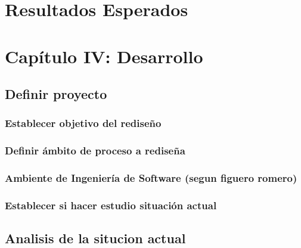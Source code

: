 \documentclass[
]{article}
\begin{document}
\hypertarget{resultados-esperados}{%
\section{Resultados Esperados}\label{resultados-esperados}}

\newpage

\hypertarget{capuxedtulo-iv-desarrollo}{%
\section{Capítulo IV: Desarrollo}\label{capuxedtulo-iv-desarrollo}}

\hypertarget{definir-proyecto-1}{%
\subsection{Definir proyecto}\label{definir-proyecto-1}}

\hypertarget{establecer-objetivo-del-rediseuxf1o-1}{%
\subsubsection{Establecer objetivo del
rediseño}\label{establecer-objetivo-del-rediseuxf1o-1}}

\hypertarget{definir-uxe1mbito-de-proceso-a-rediseuxf1a}{%
\subsubsection{Definir ámbito de proceso a
rediseña}\label{definir-uxe1mbito-de-proceso-a-rediseuxf1a}}

\hypertarget{ambiente-de-ingenieruxeda-de-software-segun-figuero-romero}{%
\subsubsection{Ambiente de Ingeniería de Software (segun figuero
romero)}\label{ambiente-de-ingenieruxeda-de-software-segun-figuero-romero}}

\hypertarget{establecer-si-hacer-estudio-situaciuxf3n-actual-1}{%
\subsubsection{Establecer si hacer estudio situación
actual}\label{establecer-si-hacer-estudio-situaciuxf3n-actual-1}}

\hypertarget{analisis-de-la-situcion-actual}{%
\subsection{Analisis de la situcion
actual}\label{analisis-de-la-situcion-actual}}
\end{document}
